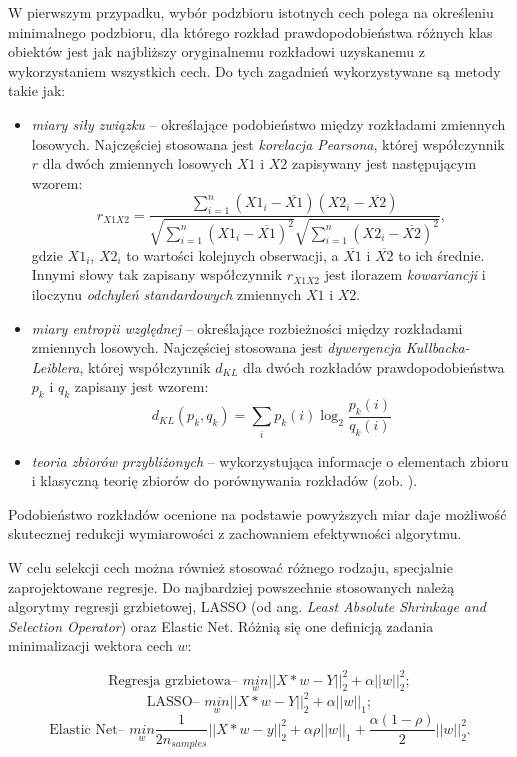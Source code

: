 W pierwszym przypadku, wybór podzbioru istotnych cech polega na określeniu minimalnego podzbioru, dla którego rozkład prawdopodobieństwa różnych klas obiektów jest jak najbliższy oryginalnemu rozkładowi uzyskanemu z wykorzystaniem wszystkich cech. Do tych zagadnień wykorzystywane są metody takie jak:
\begin{itemize}[noitemsep,nolistsep]
	\item \textit{miary siły związku} -- określające podobieństwo między rozkładami zmiennych losowych. Najczęściej stosowana jest \textit{korelacja Pearsona}, której współczynnik $r$ dla dwóch zmiennych losowych $X1$ i $X2$ zapisywany jest następującym wzorem:
	\begin{equation}
	r_{X1X2} = \frac{\sum_{i=1}^n (X1_i - \overline{X1})(X2_i - \overline{X2})}{\sqrt{\sum_{i=1}^n (X1_i - \overline{X1})^2} \sqrt{\sum_{i=1}^n (X2_i - \overline{X2})^2}},
	\end{equation}
	gdzie $X1_i$, $X2_i$ to wartości kolejnych obserwacji, a $\overline{X1}$ i $\overline{X2}$ to ich średnie. Innymi słowy tak zapisany współczynnik $r_{X1X2}$ jest ilorazem \textit{kowariancji} i iloczynu \textit{odchyleń standardowych} zmiennych $X1$ i $X2$.
	\item \textit{miary entropii względnej} --  określające rozbieżności między rozkładami zmiennych losowych. Najczęściej stosowana jest \textit{dywergencja Kullbacka-Leiblera}, której współczynnik $d_{KL}$ dla dwóch rozkładów prawdopodobieństwa $p_k$ i $q_k$ zapisany jest wzorem: 
	\begin{equation}
	d_{KL}(p_k, q_k) = \sum_{i} p_k(i) \log_2 \frac{p_k(i)}{q_k(i)}
	\end{equation}
	\item \textit{teoria zbiorów przybliżonych} -- wykorzystująca informacje o elementach zbioru i klasyczną teorię zbiorów do porównywania rozkładów (zob. \cite{Kowalik2003}).
\end{itemize}
Podobieństwo rozkładów ocenione na podstawie powyższych miar daje możliwość skutecznej redukcji wymiarowości z zachowaniem efektywności algorytmu.

W celu selekcji cech można również stosować różnego rodzaju, specjalnie zaprojektowane regresje. Do najbardziej powszechnie stosowanych należą algorytmy regresji grzbietowej, LASSO (od ang. \textit{Least Absolute Shrinkage and Selection Operator}) oraz Elastic Net. Różnią się one definicją zadania minimalizacji wektora cech $w$:

\begin{equation}
\textrm{Regresja grzbietowa-- } \underset{w}{min} ||X*w-Y||_2^2 + \alpha ||w||_2^2;
\label{equ:ridgeReg}
\end{equation}
\begin{equation}
\textrm{LASSO-- } \underset{w}{min} ||X*w-Y||_2^2 + \alpha ||w||_1;
\label{equ:lassoReg}
\end{equation}
\begin{equation}
\textrm{Elastic Net-- } \underset{w}{min} { \frac{1}{2n_{samples}} ||X*w - y||_2 ^ 2 + \alpha \rho ||w||_1 + \frac{\alpha(1-\rho)}{2} ||w||_2 ^ 2}.
\label{equ:elasticNet}
\end{equation}

